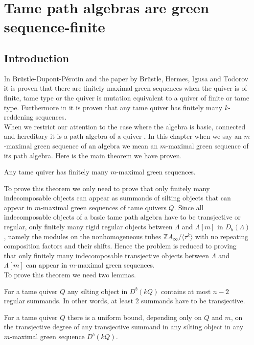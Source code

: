 \chapter{Tame path algebras are green sequence-finite}\label{C2}
\section{Introduction}
 In Br\"ustle-Dupont-P\'erotin \cite{BDP13} and the paper by Br\"ustle, Hermes, Igusa and Todorov \cite{BHIT15} it is proven that there are finitely maximal green sequences when the quiver is of finite, tame type or the quiver is mutation equivalent to a quiver of finite or tame type. Furthermore in \cite{BHIT15} it is proven that any tame quiver has finitely many $k$-reddening sequences.\\
\indent When we restrict our attention to the case where the algebra is basic, connected and hereditary it is a path algebra of a quiver \cite{ASS06}. In this chapter when we say an $m$-maximal green sequence of an algebra we mean an $m$-maximal green sequence of its path algebra. Here is the main theorem we have proven.\\
\begin{theorem}
Any tame quiver has finitely many $m$-maximal green sequences.\label{C3T}
\end{theorem}
\indent To prove this theorem we only need to prove that only finitely many indecomposable objects can appear as summands of silting objects that can appear in $m$-maximal green sequences of tame quivers $Q$. Since all indecomposable objects of a basic tame path algebra have to be transjective or regular, only finitely many rigid regular objects between $\Lambda$ and $\Lambda[m]$ in $D_b(\Lambda)$, namely the modules on the nonhomogeneous tubes $\mathbb{Z}A_\infty/\langle\tau^k\rangle$ with no repeating composition factors and their shifts. Hence the problem is reduced to proving that only finitely many indecomposable transjective objects between $\Lambda$ and $\Lambda[m]$ can appear in $m$-maximal green sequences.\\
\indent To prove this theorem we need two lemmas.\\
\begin{lemma}\label{def:C3L1}
For a tame quiver $Q$ any silting object in $D^b(kQ)$ contains at most $n-2$ regular summands. In other words, at least 2 summands have to be transjective. 
\end{lemma}
\begin{lemma}\label{def:C3L2}
For a tame quiver $Q$ there is a uniform bound, depending only on $Q$ and $m$, on the transjective degree of any transjective summand in any silting object in any $m$-maximal green sequence $D^b(kQ)$.
\end{lemma}
